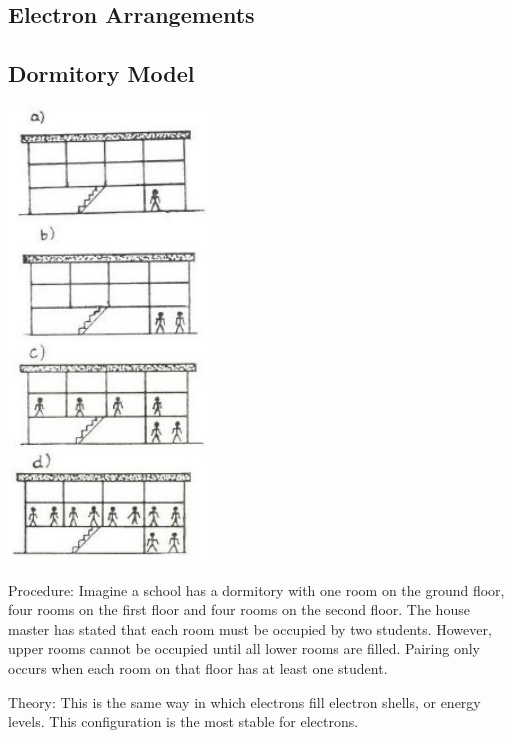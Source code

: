 \begin{multicols}{2}

\section*{Electron Arrangements}


\subsection{Dormitory Model}

\begin{center}
\includegraphics[width=0.4\textwidth]{./img/source/dorm-arrangement.jpg}
\end{center}

\begin{description*}
\item[Procedure:]{Imagine a school has a dormitory with one room on the
ground floor, four rooms on the first floor and
four rooms on the second floor. The house
master has stated that each room must be occupied by two students. However, upper rooms cannot be occupied until all lower rooms are filled. Pairing only occurs when each room on that floor has at least one student.}
\item[Theory:]{This is the same way in which electrons fill electron shells, or energy levels. This configuration is the most stable for electrons.}
\end{description*}


\end{multicols}
